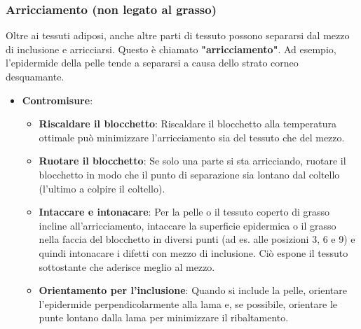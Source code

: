 \subsubsection{Arricciamento (non legato al grasso)}
Oltre ai tessuti adiposi, anche altre parti di tessuto possono separarsi dal mezzo di inclusione e arricciarsi.  Questo è chiamato \textbf{"arricciamento"}. Ad esempio, l'epidermide della pelle tende a separarsi a causa dello strato corneo desquamante. 
\begin{itemize}
    \item   \textbf{Contromisure}:
    \begin{itemize}
        \item   \textbf{Riscaldare il blocchetto}: Riscaldare il blocchetto alla temperatura ottimale può minimizzare l'arricciamento sia del tessuto che del mezzo. 
        \item   \textbf{Ruotare il blocchetto}: Se solo una parte si sta arricciando, ruotare il blocchetto in modo che il punto di separazione sia lontano dal coltello (l'ultimo a colpire il coltello). 
        \item   \textbf{Intaccare e intonacare}: Per la pelle o il tessuto coperto di grasso incline all'arricciamento, intaccare la superficie epidermica o il grasso nella faccia del blocchetto in diversi punti (ad es. alle posizioni 3, 6 e 9) e quindi intonacare i difetti con mezzo di inclusione.  Ciò espone il tessuto sottostante che aderisce meglio al mezzo. 
        \item   \textbf{Orientamento per l'inclusione}: Quando si include la pelle, orientare l'epidermide perpendicolarmente alla lama e, se possibile, orientare le punte lontano dalla lama per minimizzare il ribaltamento. 
    \end{itemize}
\end{itemize}

